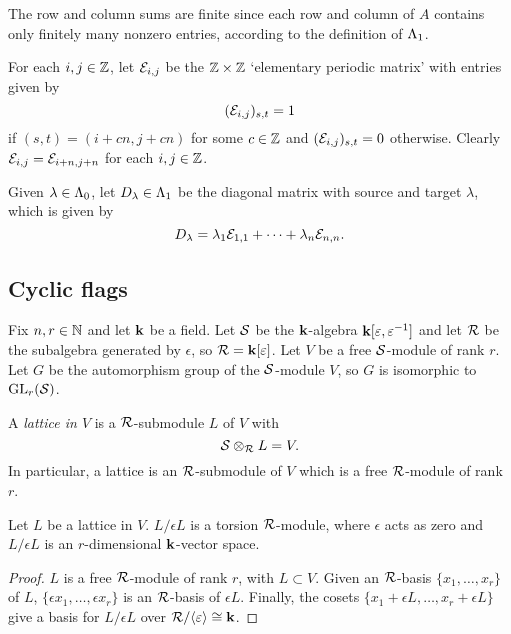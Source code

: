 \documentclass[a4paper, 11pt]{report}
\begin{document}
The row and column sums are finite since each row and column of $A$ contains only finitely many nonzero entries, according to the definition of $\Lambda_1{}$.

	For each $i,j\in\mathbb{Z}$, let $\mathcal{E}_{i,j}$ be the $\mathbb{Z}\times\mathbb{Z}$ `elementary periodic matrix' with entries given by
\begin{equation*}
(\mathcal{E}_{i,j})_{s,t}=1
\end{equation*}
if $(s,t) = (i+cn,j+cn)$ for some $c\in\mathbb{Z}$ and $(\mathcal{E}_{i,j})_{s,t}=0$ otherwise. Clearly $\mathcal{E}_{i,j} = \mathcal{E}_{i+n,j+n}$ for each $i,j\in\mathbb{Z}$.

Given $\lambda\in\Lambda_0{}$, let $D_{\lambda}\in\Lambda_1{}$ be the diagonal matrix with source and target $\lambda$, which is given by 
\begin{equation}\label{eq:diagonal-matrices}
D_{\lambda} = \lambda_1\mathcal{E}_{1,1} +\cdots +\lambda_n\mathcal{E}_{n,n}.
\end{equation}

\subsection{Cyclic flags}

Fix $n,r\in\mathbb{N}$ and let $\mathbf{k}$ be a field. Let $\mathcal{S}$ be the $\mathbf{k}$-algebra $\mathbf{k}[\varepsilon,\varepsilon^{-1}]$ and let $\mathcal{R}$ be the subalgebra generated by $\epsilon$, so $\mathcal{R} = \mathbf{k}[\varepsilon]$. Let $V$ be a free $\mathcal{S}$-module of rank $r$. Let $G$ be the automorphism group of the $\mathcal{S}$-module $V$, so $G$ is isomorphic to $\operatorname{GL}_{r}(\mathcal{S})$.

\begin{definition}\label{definition:lattice}
A \emph{lattice in $V$} is a $\mathcal{R}$-submodule $L$ of $V$ with
\begin{equation*}
\mathcal{S}\otimes_{\mathcal{R}} L = V.
\end{equation*}
In particular, a lattice is an $\mathcal{R}$-submodule of $V$ which is a free $\mathcal{R}$-module of rank $r$.
\end{definition}

\begin{lemma}
Let $L$ be a lattice in $V$. $L/{\epsilon L}$ is a torsion $\mathcal{R}$-module, where $\epsilon$ acts as zero and $L/{\epsilon L}$ is an $r$-dimensional $\mathbf{k}$-vector space.
\end{lemma}

\begin{proof}
$L$ is a free $\mathcal{R}$-module of rank $r$, with $L\subset V$. Given an $\mathcal{R}$-basis $\{x_1,\ldots,x_r\}$ of $L$, $\{\epsilon x_1,\ldots, \epsilon x_r\}$ is an $\mathcal{R}$-basis of $\epsilon L$. Finally, the cosets $\{ x_1 + \epsilon L,\ldots, x_r + \epsilon L\}$ give a basis for $L/{\epsilon L}$ over $\mathcal{R}/{\langle \varepsilon\rangle}\cong \mathbf{k}$.
\end{proof}
\end{document}

